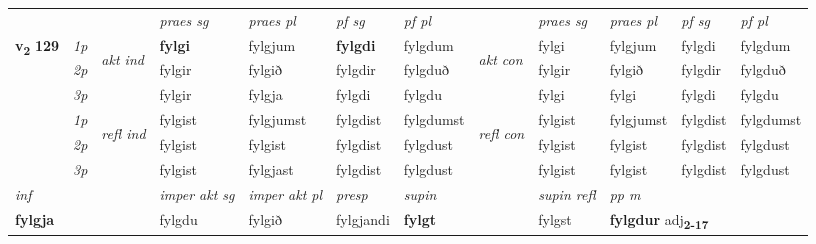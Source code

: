 \begin{longtable}[l]{X>{\footnotesize\itshape}llXXXXlXXXX}
 & &   & \textit{praes sg}  & \textit{praes pl}    & \textit{ pf sg} & \textit{pf pl} & & \textit{praes sg}  & \textit{praes pl}    & \textit{pf sg} & \textit{pf pl }  \\ \cmidrule{4-7} \cmidrule{9-12}
 \multirow{2}{*}{{{\textbf{v{\textsubscript{2}}} \Large{\textbf{129}}}}}  & 1p & \multirow{3}{*}{\begin{turn}{90}\textit{akt ind}\end{turn}} & \textbf{fylgi} & fylgjum & \textbf{fylgdi} & fylgdum & \multirow{3}{*}{\begin{turn}{90}\textit{akt con}\end{turn}} &fylgi & fylgjum & fylgdi & fylgdum\\*
 & 2p &  &  fylgir  & fylgið & fylgdir & fylgduð & & fylgir & fylgið & fylgdir & fylgduð \\*
 & 3p &  & fylgir & fylgja & fylgdi & fylgdu & & fylgi & fylgi& fylgdi & fylgdu \\*
\cmidrule{4-7} \cmidrule{9-12}
 & 1p & \multirow{3}{*}{\begin{turn}{90}\textit{refl ind}\end{turn}}  & fylgist & fylgjumst & fylgdist & fylgdumst & \multirow{3}{*}{\begin{turn}{90}\textit{refl con}\end{turn}}  &fylgist & fylgjumst & fylgdist & fylgdumst \\*
 & 2p &  & fylgist & fylgist & fylgdist & fylgdust & &fylgist & fylgist & fylgdist & fylgdust \\*
 & 3p  & & fylgist & fylgjast & fylgdist & fylgdust & & fylgist & fylgist& fylgdist & fylgdust \\*
\cmidrule{4-7} \cmidrule{9-12}

   {\textit{inf}} & &  & \textit{imper akt sg} & \textit{imper akt pl}   & \textit{presp} & \textit{supin} && \textit{supin refl} & \textit{pp m} \\*
  {\textbf{fylgja}} & && fylgdu  & fylgið   & fylgjandi &  \textbf{fylgt} && fylgst & \multicolumn{2}{l}{\textbf{fylgdur} adj\textbf{\textsubscript{2-17}}} \\*

\midrule


\end{longtable}
